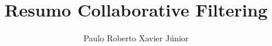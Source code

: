\documentclass[a4paper,11pt]{article}
\begin{document}
\title{Resumo Collaborative Filtering}
\author{Paulo Roberto Xavier Júnior}
\def\email{contato.pauloxavier@gmail.com}
\def\handindate{08/11/2016}

\maketitle





\end{document}
